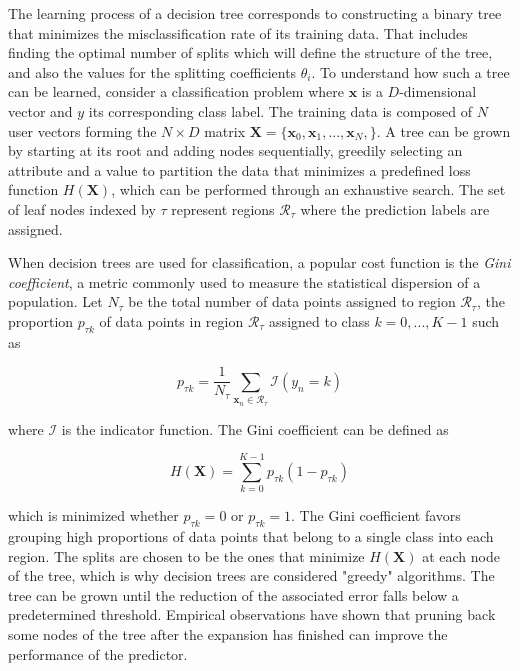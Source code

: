 \documentclass{kththesis}
\begin{document}
The learning process of a decision tree corresponds to constructing a binary tree that minimizes the misclassification rate of its training data. That includes finding the optimal number of splits which will define the structure of the tree, and also the values for the splitting coefficients $\theta_i$. To understand how such a tree can be learned, consider a classification problem where $\mathbf{x}$ is a $D$-dimensional vector and $y$ its corresponding class label. The training data is composed of $N$ user vectors forming the $N \times D$ matrix $\mathbf{X} = \{\mathbf{x}_0, \mathbf{x}_1, ..., \mathbf{x}_N,\}$. A tree can be grown by starting at its root and adding nodes sequentially, greedily selecting an attribute and a value to partition the data that minimizes a predefined loss function $H(\mathbf{X})$, which can be performed through an exhaustive search. The set of leaf nodes indexed by $\tau$ represent regions $\mathcal{R}_\tau$ where the prediction labels are assigned.

When decision trees are used for classification, a popular cost function is the \emph{Gini coefficient}, a metric commonly used to measure the statistical dispersion of a population. Let $N_\tau$ be the total number of data points assigned to region $\mathcal{R}_\tau$,  the proportion $p_{\tau k}$ of data points in region $\mathcal{R}_\tau$ assigned to class $k = 0,...,K-1$ such as 

\begin{equation}
p_{\tau k} = \frac{1}{N_\tau} \sum_{\mathbf{x}_n \in \mathcal{R}_\tau} \mathcal{I}(y_n = k)
\end{equation}
 
 where $\mathcal{I}$ is the indicator function. The Gini coefficient can be defined as 
 
 \begin{equation}
 H(\mathbf{X}) = \sum_{k=0}^{K-1} p_{\tau k} (1-p_{\tau k})
 \end{equation}
 
which is minimized whether $p_{\tau k}=0$ or $p_{\tau k}=1$. The Gini coefficient favors grouping high proportions of data points that belong to a single class into each region. The splits are chosen to be the ones that minimize $H(\mathbf{X})$ at each node of the tree, which is why decision trees are considered "greedy" algorithms. The tree can be grown until the reduction of the associated error falls below a predetermined threshold. Empirical observations have shown that pruning back some nodes of the tree after the expansion has finished can improve the performance of the predictor.
 
\end{document}
